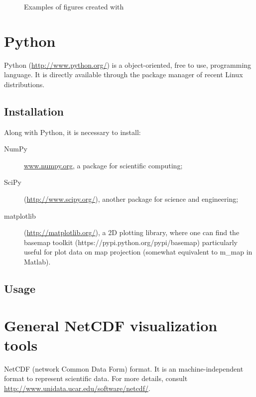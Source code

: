 \begin{figure}[H]
\centering
{}
\caption{Examples of figures created with \matlab}
\end{figure}





\section{Python}


Python (\url{http://www.python.org/}) is a object-oriented, free to use, programming language. It is directly available through the package manager of recent Linux distributions.

\subsection{Installation}

Along with Python, it is necessary to install:
\begin{description}
\item[NumPy] \url{www.numpy.org}, a package for scientific computing;
\item[SciPy] (\url{http://www.scipy.org/}), another package for science and engineering;
\item[matplotlib] (\url{http://matplotlib.org/}), a 2D plotting library, where one can find the basemap toolkit (https://pypi.python.org/pypi/basemap) particularly useful for plot data on map projection (somewhat equivalent to m\_map in Matlab).
\end{description}

\subsection{Usage}


\section{General NetCDF visualization tools}

NetCDF (network Common Data Form) format. It is an machine-independent format to represent scientific data. For more details, consult \url{http://www.unidata.ucar.edu/software/netcdf/}. 

